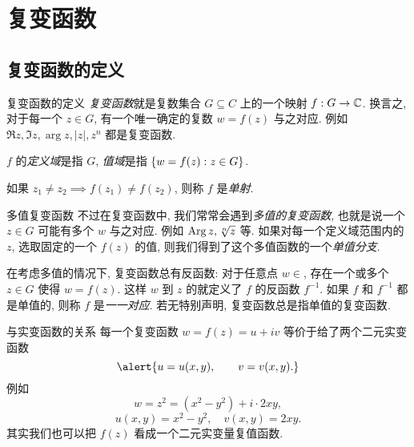 \section{复变函数}

\subsection{复变函数的定义}
\begin{frame}{复变函数的定义}
\onslide<+->
\emph{复变函数}就是复数集合 $G\subseteq C$ 上的一个映射 $f:G\to {\mathbb{C}}$.
\onslide<+->
换言之, 对于每一个 $z\in G$, 有一个唯一确定的复数 $w=f(z)$ 与之对应.
\onslide<+->
例如 $\Re z,\Im z,\arg z,|z|,z^n$ 都是复变函数.

\onslide<+->
$f$ 的\emph{定义域}是指 $G$, \emph{值域}是指 ${\left\{w=f(z):z\in G\right\}}$.

\onslide<+->
如果 $z_1\neq z_2\implies f(z_1)\neq f(z_2)$, 则称 $f$ 是\emph{单射}.
\end{frame}


\begin{frame}{多值复变函数}
\onslide<+->
不过在复变函数中, 我们常常会遇到\emph{多值的复变函数}, 也就是说一个 $z\in G$ 可能有多个 $w$ 与之对应.
\onslide<+->
例如 $\operatorname{Arg} z,\sqrt[n]z$ 等.
\onslide<+->
如果对每一个定义域范围内的 $z$, 选取固定的一个 $f(z)$ 的值, 则我们得到了这个多值函数的一个\emph{单值分支}.

\onslide<+->
在考虑多值的情况下, 复变函数总有反函数:
\onslide<+->
对于任意点 $w\in $, 存在一个或多个 $z\in G$ 使得 $w=f(z)$.
\onslide<+->
这样 $w$ 到 $z$ 的就定义了 $f$ 的反函数 $f^{-1}$.
\onslide<+->
如果 $f$ 和 $f^{-1}$ 都是单值的, 则称 $f$ 是\emph{一一对应}.
\onslide<+->
若无特别声明, \alert{复变函数总是指单值的复变函数}.
\end{frame}


\begin{frame}{与实变函数的关系}
\onslide<+->
\alert{每一个复变函数 $w=f(z)=u+iv$ 等价于给了两个二元实变函数}
\[\alert{u=u(x,y),\qquad v=v(x,y).}\]
\onslide<+->
例如
\[w=z^2=(x^2-y^2)+i\cdot 2xy,\]
\[u(x,y)=x^2-y^2,\quad v(x,y)=2xy.\]
\onslide<+->
其实我们也可以把 $f(z)$ 看成一个二元实变量复值函数.
\end{frame}


